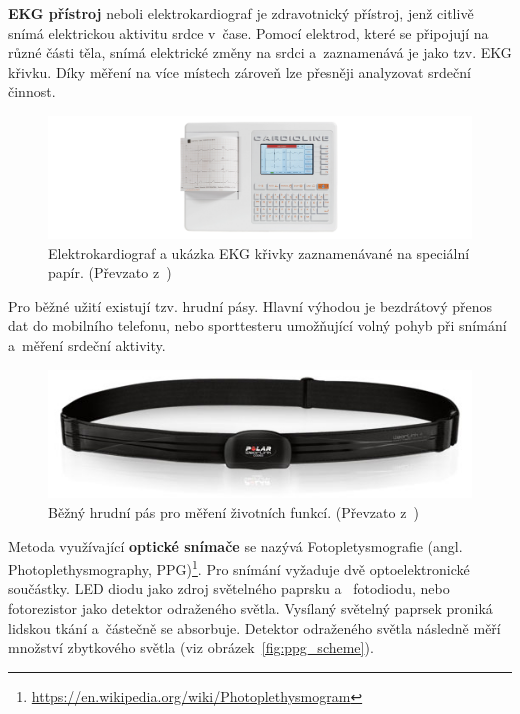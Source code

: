         \textbf{EKG přístroj} neboli elektrokardiograf je zdravotnický přístroj, jenž citlivě snímá elektrickou aktivitu srdce v~čase. Pomocí elektrod, které se připojují na různé části těla, snímá elektrické změny na srdci a~zaznamenává je jako tzv. EKG křivku. Díky měření na více místech zároveň lze přesněji analyzovat srdeční činnost. 
        
        \begin{figure}[H]
            \centering
            \includegraphics[width=\textwidth]{obrazky-figures/ekg_dev.png}
            \caption{Elektrokardiograf a ukázka EKG křivky zaznamenávané na speciální papír. (Převzato z~\cite{web_ekg})}
            \label{fig:ekd_dev}
        \end{figure}
        
        Pro běžné užití existují tzv. hrudní pásy. Hlavní výhodou je bezdrátový přenos dat do mobilního telefonu, nebo sporttesteru umožňující volný pohyb při snímání a~měření srdeční aktivity.
        
        \begin{figure}[H]
            \centering
            \includegraphics{obrazky-figures/Hrudni-pas.png}
            \caption{Běžný hrudní pás pro měření životních funkcí. (Převzato z~\cite{wiki:commons})}
            \label{fig:hrudni_pas}
        \end{figure}
        
        Metoda využívající \textbf{optické snímače} se nazývá Fotopletysmografie (angl. Photoplethysmography, PPG)\footnote{\url{https://en.wikipedia.org/wiki/Photoplethysmogram}}. Pro snímání vyžaduje dvě optoelektronické součástky. LED diodu jako zdroj světelného paprsku a~ fotodiodu, nebo fotorezistor jako detektor odraženého světla. Vysílaný světelný paprsek proniká lidskou tkání a~částečně se absorbuje. Detektor odraženého světla následně měří množství zbytkového světla (viz obrázek~\ref{fig:ppg_scheme}). 
        
